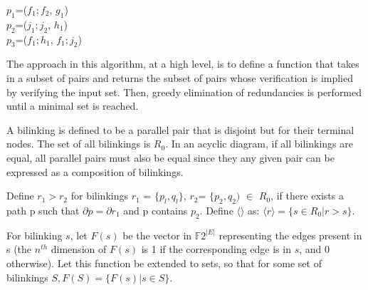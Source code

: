 \documentclass[sigplan,review,anonymous]{acmart}
\begin{document}
\begin{center}

$p_1$=($f_1;f_2$, $g_1$)\\
$p_2$=($j_1;j_2$, $h_1$)\\
$p_3$=($f_1;h_1$, $f_1;j_2$)
\end{center}

The approach in this algorithm, at a high level, is to define a function that takes in a subset of pairs and returns the subset of pairs whose verification is implied by verifying the input set. Then, greedy elimination of redundancies is performed until a minimal set is reached.

A bilinking is defined to be a parallel pair that is disjoint but for their terminal nodes. The set of all bilinkings is $R_0$.
In an acyclic diagram, if all bilinkings are equal, all parallel pairs must also be equal since they any given pair can be expressed as a composition of bilinkings.

Define $r_1>r_2$ for bilinkings $r_1$ = $\{p_l,q_l\}$, $r_2$= $\{p_2, q_2)$ $\in$ $R_0$, if there exists a path p such that $\partial p=\partial r_1$ and p contains $p_2$.
Define $\langle\rangle$ as:
$\langle r \rangle = \{ s\in R_0| r>s\}$.

For bilinking $s$, let $F(s)$ be the vector in $\mathbb{F}2^{|E|}$ representing the edges present in s (the $n^{th}$ dimension of $F(s)$ is 1 if the corresponding edge is in $s$, and 0 otherwise). Let this function be extended to sets, so that for some set of bilinkings $S, F(S) = \{ F(s) | s\in S \}$.
\end{document}

